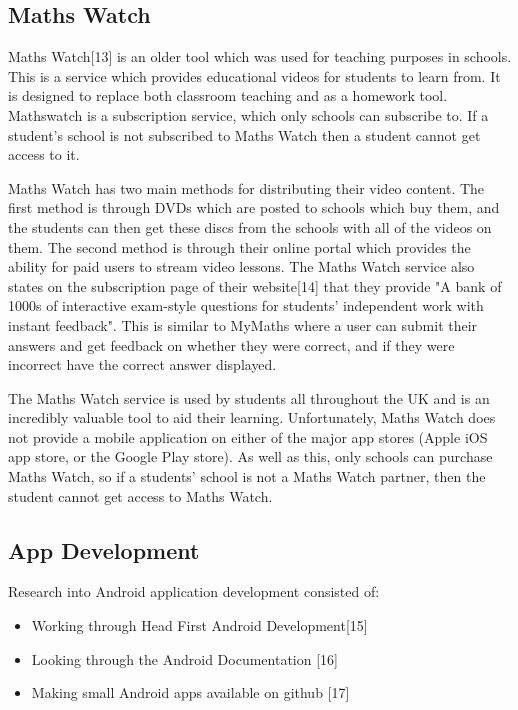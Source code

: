 \documentclass{article}
\begin{document}
\subsection{Maths Watch}

Maths Watch[13] is an older tool which was used for teaching purposes in schools. This is a service which provides educational videos for students to learn from. It is designed to replace both classroom teaching and as a homework tool. Mathswatch is a subscription service, which only schools can subscribe to. If a student's school is not subscribed to Maths Watch then a student cannot get access to it. \par

Maths Watch has two main methods for distributing their video content. The first method is through DVDs which are posted to schools which buy them, and the students can then get these discs from the schools with all of the videos on them. The second method is through their online portal which provides the ability for paid users to stream video lessons. The Maths Watch service also states on the subscription page of their website[14] that they provide "A bank of 1000s of interactive exam-style questions for students' independent work with instant feedback". This is similar to MyMaths where a user can submit their answers and get feedback on whether they were correct, and if they were incorrect have the correct answer displayed. \par

The Maths Watch service is used by students all throughout the UK and is an incredibly valuable tool to aid their learning. Unfortunately, Maths Watch does not provide a mobile application on either of the major app stores (Apple iOS app store, or the Google Play store). As well as this, only schools can purchase Maths Watch, so if a students' school is not a Maths Watch partner, then the student cannot get access to Maths Watch. \par

\subsection{App Development}

Research into Android application development consisted of: 

\begin{itemize}
	\item Working through Head First Android Development[15]
	\item Looking through the Android Documentation [16]
	\item Making small Android apps available on github [17]
\end{itemize}
\end{document}
